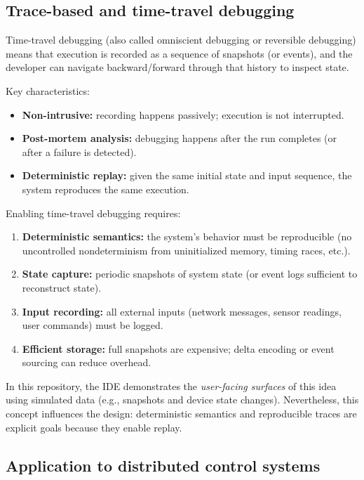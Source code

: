 \subsection{Trace-based and time-travel debugging}

Time-travel debugging (also called omniscient debugging or reversible debugging) means that execution is recorded as a sequence of snapshots (or events), and the developer can navigate backward/forward through that history to inspect state.

Key characteristics:
\begin{itemize}
  \item \textbf{Non-intrusive:} recording happens passively; execution is not interrupted.
  \item \textbf{Post-mortem analysis:} debugging happens after the run completes (or after a failure is detected).
  \item \textbf{Deterministic replay:} given the same initial state and input sequence, the system reproduces the same execution.
\end{itemize}


Enabling time-travel debugging requires:
\begin{enumerate}
  \item \textbf{Deterministic semantics:} the system's behavior must be reproducible (no uncontrolled nondeterminism from uninitialized memory, timing races, etc.).
  \item \textbf{State capture:} periodic snapshots of system state (or event logs sufficient to reconstruct state).
  \item \textbf{Input recording:} all external inputs (network messages, sensor readings, user commands) must be logged.
  \item \textbf{Efficient storage:} full snapshots are expensive; delta encoding or event sourcing can reduce overhead.
\end{enumerate}

In this repository, the IDE demonstrates the \emph{user-facing surfaces} of this idea using simulated data (e.g., snapshots and device state changes).
Nevertheless, this concept influences the design: deterministic semantics and reproducible traces are explicit goals because they enable replay.

\subsection{Application to distributed control systems}

